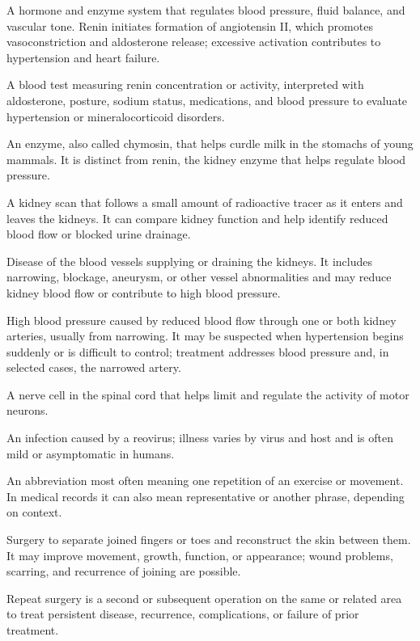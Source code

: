  A hormone and enzyme system that regulates blood pressure, fluid balance, and vascular tone. Renin initiates formation of angiotensin II, which promotes vasoconstriction and aldosterone release; excessive activation contributes to hypertension and heart failure.

 A blood test measuring renin concentration or activity, interpreted with aldosterone, posture, sodium status, medications, and blood pressure to evaluate hypertension or mineralocorticoid disorders.

 An enzyme, also called chymosin, that helps curdle milk in the stomachs of young mammals. It is distinct from renin, the kidney enzyme that helps regulate blood pressure.

 A kidney scan that follows a small amount of radioactive tracer as it enters and leaves the kidneys. It can compare kidney function and help identify reduced blood flow or blocked urine drainage.

 Disease of the blood vessels supplying or draining the kidneys. It includes narrowing, blockage, aneurysm, or other vessel abnormalities and may reduce kidney blood flow or contribute to high blood pressure.

 High blood pressure caused by reduced blood flow through one or both kidney arteries, usually from narrowing. It may be suspected when hypertension begins suddenly or is difficult to control; treatment addresses blood pressure and, in selected cases, the narrowed artery.

 A nerve cell in the spinal cord that helps limit and regulate the activity of motor neurons.

 An infection caused by a reovirus; illness varies by virus and host and is often mild or asymptomatic in humans.

 An abbreviation most often meaning one repetition of an exercise or movement. In medical records it can also mean representative or another phrase, depending on context.

 Surgery to separate joined fingers or toes and reconstruct the skin between them. It may improve movement, growth, function, or appearance; wound problems, scarring, and recurrence of joining are possible.

 Repeat surgery is a second or subsequent operation on the same or related area to treat persistent disease, recurrence, complications, or failure of prior treatment.

